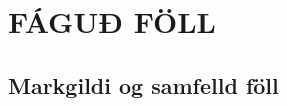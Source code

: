 \newenvironment{se}{\begin{setning+}\sl}{\hfill$\square$\end{setning+}\rm}
\newenvironment{sex}{\begin{setning+}\sl}{\hfill$\blacksquare$\end{setning+}\rm}
\newenvironment{sk}{\begin{skilgreining+}\rm}{\hfill$\square$\end{skilgreining+}\rm}
\newenvironment{sesk}{\begin{setningogskilgreining+}\rm}{\hfill$\square$\end{setningogskilgreining+}\rm}
\newenvironment{hs}{\begin{hjalparsetning+}\sl}{\hfill$\square$\end{hjalparsetning+}\rm}
\newenvironment{fs}{\begin{fylgisetning+}\sl}{\hfill$\square$\end{fylgisetning+}\rm}
\newenvironment{sy}{\begin{synidaemi+}\rm}{\hfill$\square$\end{synidaemi+}\rm}
\newenvironment{fo}{\begin{forrit+}\rm}{\hfill\end{forrit+}\rm}
\newenvironment{so}{\medbreak\noindent{\it Sönnun:}\rm}{\hfill$\blacksquare$\rm}
\newenvironment{sotx}[1]{\medbreak\noindent{\it #1:}\rm}{\hfill$\blacksquare$\rm}
\newcommand{\aefing}{\section{Æfingardæmi} \setcounter{daemateljari}{1}}
\newcommand{\daemi}{
{\medskip\noindent{\bf \thedaemateljari.}}
\addtocounter{daemateljari}{1}
}

\def\svar#1{\smallskip\noindent{\bf #1.} \ }
\def\lausn#1{\smallskip\noindent{\bf #1.} \ }
\def\ugrein#1{\medbreak\noindent{\bf #1.} }
\newcommand{\samantekt}{\noindent{\bf Samantekt.} }


%
\chapter
{FÁGUÐ FÖLL}
 



\section{Markgildi og samfelld föll}

